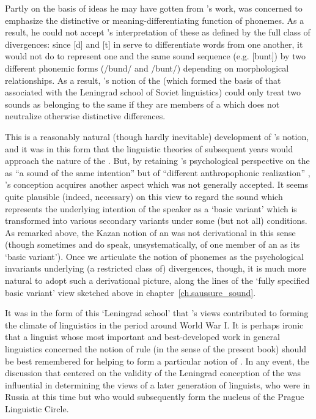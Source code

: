 Partly on the basis of ideas he may have gotten from {\Passy}'s work,
{} was concerned to emphasize the distinctive or
meaning-differentiating function of phonemes. As a result, he could
not accept {\Baudouin}'s interpretation of these as defined by the full
class of divergences: since [d] and [t] in  serve to
differentiate words from one another, it would not do to represent one
and the same sound sequence (e.g. [bunt]) by two different phonemic
forms (/bund/ and /bunt/) depending on morphological relationships. As
a result, {}'s notion of the  (which formed the basis of
that associated with the Leningrad school of Soviet linguistics) could
only treat two sounds as belonging to the same  if they are
members of a  which does not neutralize otherwise
distinctive differences.

This is a reasonably natural (though hardly inevitable) development of
{\Baudouin}'s notion, and it was in this form that the linguistic
theories of subsequent years would approach the nature of the
. But, by retaining {\Baudouin}'s psychological perspective on the
 as ``a sound of the same intention'' but of ``different
anthropophonic realization'' \citep[171]{baudouin95:attempt}, {}'s
conception acquires another aspect which was not generally
ac\-cepted. It seems quite plausible (indeed, necessary) on this view to
regard the sound which represents the underlying intention of the
speaker as a `basic variant' which is transformed into various
secondary variants under some (but not all) conditions. As remarked
above, the Kazan notion of an  was not derivational in this
sense (though sometimes {\Baudouin} and {\Kruszewski} do speak,
unsystematically, of one member of an  as its `basic
variant'). Once we articulate the notion of phonemes as the
psychological invariants underlying (a restricted class of)
divergences, though, it is much more natural to adopt such a
derivational picture, along the lines of the `fully specified basic
variant' view sketched above in chapter~\ref{ch.saussure_sound}.

It was in the form of this `Leningrad school'  that {\DeCourtenay}'s views contributed to forming the climate of 
linguistics in the period around World War I. It is perhaps ironic
that a linguist whose most important and best-developed work in
general linguistics concerned the notion of rule (in the sense of the
present book) should be best remembered for helping to form a
particular notion of . In any event, the
discussion that centered on the validity of the Leningrad conception
of the  was influential in determining the views of a later
generation of linguists, who were in Russia at this time but who would
subsequently form the {nucleus} of the Prague Linguistic Circle.

